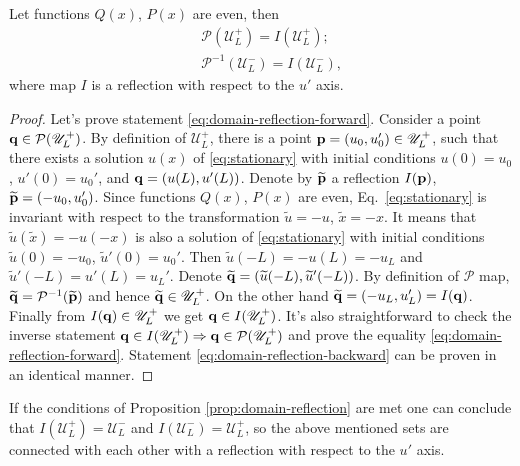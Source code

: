 \begin{proposition}
	Let functions $Q(x)$, $P(x)$ are even, then 
	\begin{eqnarray}
		&& \mathcal{P}(\mathscr{U}_L^+) = I (\mathscr{U}_L^+); \label{eq:domain-reflection-forward} \\
		&& \mathcal{P}^{-1}(\mathscr{U}_L^-) = I (\mathscr{U}_L^-), 	\label{eq:domain-reflection-backward}
	\end{eqnarray}
	where map $I$ is a reflection with respect to the $u'$ axis.
\label{prop:domain-reflection}
\end{proposition}
\begin{proof}
	Let's prove statement \eqref{eq:domain-reflection-forward}.
	Consider a point $\vb{q} \in \mathcal{P}(\mathscr{U}_L^+)$.
	By definition of $\mathscr{U}_L^+$, there is a point $\vb{p} = (u_0, u_0') \in \mathscr{U}_L^+$, such that there exists a solution $u(x)$ of \eqref{eq:stationary} with initial conditions $u(0) = u_0$, $u'(0) = u_0'$, and $\vb{q} = (u(L), u'(L))$.
	Denote by $\widetilde{\vb{p}}$ a reflection $I(\vb{p})$, $\widetilde{\vb{p}} = (-u_0, u_0')$.
	Since functions $Q(x)$, $P(x)$ are even, Eq.~\eqref{eq:stationary} is invariant with respect to the transformation $\widetilde{u} = -u$, $\widetilde{x} = -x$.
	It means that $\widetilde{u}(\widetilde{x}) = -u(-x)$ is also a solution of \eqref{eq:stationary} with initial conditions $\widetilde{u}(0) = -u_0$, $\widetilde{u}'(0) = u_0'$.
	Then $\widetilde{u}(-L) = -u(L) = -u_L$ and $\widetilde{u}'(-L) = u'(L) = u_L'$.
	Denote $\widetilde{\vb{q}} = (\widetilde{u}(-L), \widetilde{u}'(-L))$.
	By definition of $\mathcal{P}$ map, $\widetilde{\vb{q}} = \mathcal{P}^{-1}(\widetilde{\vb{p}})$ and hence $\widetilde{\vb{q}} \in \mathscr{U}_L^+$.
	On the other hand $\widetilde{\vb{q}} = (-u_L, u_L') = I(\vb{q})$.
	Finally from $I(\vb{q)} \in \mathscr{U}_L^+$ we get $\vb{q} \in I(\mathscr{U}_L^+)$.
	It's also straightforward to check the inverse statement $\vb{q} \in I(\mathscr{U}_L^+) \Rightarrow \vb{q} \in \mathcal{P}(\mathscr{U}_L^+)$ and prove the equality \eqref{eq:domain-reflection-forward}.
	Statement \eqref{eq:domain-reflection-backward} can be proven in an identical manner.
\end{proof}

If the conditions of Proposition \ref{prop:domain-reflection} are met one can conclude that $I (\mathscr{U}_L^+) = \mathscr{U}_L^-$ and $I (\mathscr{U}_L^-) = \mathscr{U}_L^+$, so the above mentioned sets are connected with each other with a reflection with respect to the $u'$ axis.


